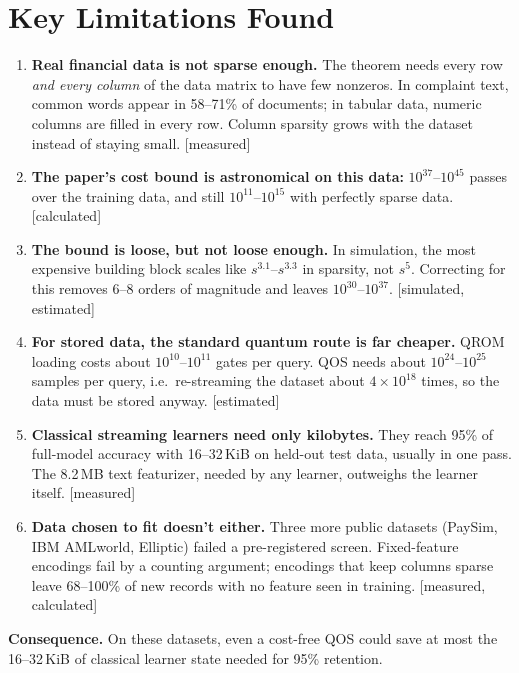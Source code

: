 \documentclass[10pt]{article}
\newcommand{\evlabel}[1]{\textsf{\small[#1]}}
\newenvironment{sectionblock}
{%
    \par
    \vspace{2pt}
    \noindent
    \begin{minipage}{\textwidth}
}
{%
    \end{minipage}
    \par
    \vspace{5pt}
}
\begin{document}
\begin{sectionblock}

\section{Key Limitations Found}
\label{sec:summary}

\begin{enumerate}
    \item \textbf{Real financial data is not sparse enough.}
    The theorem needs every row \emph{and every column} of the data matrix to have few nonzeros. In complaint text, common words appear in 58--71\% of documents; in tabular data, numeric columns are filled in every row. Column sparsity grows with the dataset instead of staying small. \evlabel{measured}

    \item \textbf{The paper's cost bound is astronomical on this data:}
    $10^{37}$--$10^{45}$ passes over the training data, and still $10^{11}$--$10^{15}$ with perfectly sparse data. \evlabel{calculated}

    \item \textbf{The bound is loose, but not loose enough.}
    In simulation, the most expensive building block scales like $s^{3.1}$--$s^{3.3}$ in sparsity, not $s^{5}$. Correcting for this removes 6--8 orders of magnitude and leaves $10^{30}$--$10^{37}$. \evlabel{simulated, estimated}

    \item \textbf{For stored data, the standard quantum route is far cheaper.}
    QROM loading costs about $10^{10}$--$10^{11}$ gates per query. QOS needs about $10^{24}$--$10^{25}$ samples per query, i.e.\ re-streaming the dataset about $4\times 10^{18}$ times, so the data must be stored anyway. \evlabel{estimated}

    \item \textbf{Classical streaming learners need only kilobytes.}
    They reach 95\% of full-model accuracy with 16--32\,KiB on held-out test data, usually in one pass. The 8.2\,MB text featurizer, needed by any learner, outweighs the learner itself. \evlabel{measured}

    \item \textbf{Data chosen to fit doesn't either.}
    Three more public datasets (PaySim, IBM AMLworld, Elliptic) failed a pre-registered screen. Fixed-feature encodings fail by a counting argument; encodings that keep columns sparse leave 68--100\% of new records with no feature seen in training. \evlabel{measured, calculated}
\end{enumerate}

\textbf{Consequence.} On these datasets, even a cost-free QOS could save at most the 16--32\,KiB of classical learner state needed for 95\% retention.

\end{sectionblock}
\end{document}
